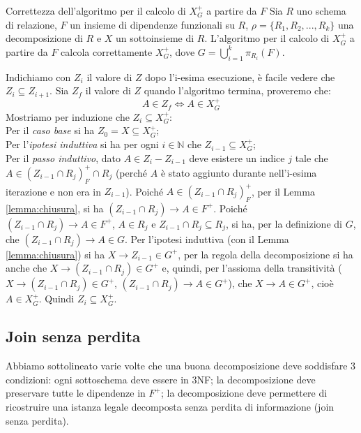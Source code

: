 \begin{enumerate}
    \begin{Thm}{Correttezza dell'algoritmo per il calcolo di $X^+_G$ a partire da $F$}{}
        Sia $R$ uno schema di relazione, $F$ un insieme di dipendenze funzionali su $R$, $\rho=\{R_1, R_2,..., R_k\}$ una decomposizione di $R$ e $X$ un sottoinsieme di $R$. L'algoritmo per il calcolo di $X^+_G$ a partire da $F$ calcola correttamente $X^+_G$, dove $G=\bigcup^k_{i=1}\pi_{R_i}(F)$.

        \begin{demonstration}
            Indichiamo con $Z_i$ il valore di $Z$ dopo l'i-esima esecuzione, è facile vedere che $Z_i\subseteq Z_{i+1}$. Sia $Z_f$ il valore di $Z$ quando l'algoritmo termina, proveremo che:
            \begin{equation*}
                A\in Z_f\iff A\in X^+_G
            \end{equation*}
            Mostriamo per induzione che $Z_i\subseteq X^+_G$:\\
            Per il \textit{caso base} si ha $Z_0=X\subseteq X^+_G$;\\
            Per l'\textit{ipotesi induttiva} si ha per ogni $i\in\mathbb{N}$ che $Z_{i-1}\subseteq X^+_G$;\\
            Per il \textit{passo induttivo}, dato $A\in Z_i-Z_{i-1}$ deve esistere un indice $j$ tale che $A\in(Z_{i-1}\cap R_j)^+_F\cap R_j$ (perché $A$ è stato aggiunto durante nell'i-esima iterazione e non era in $Z_{i-1}$). Poiché $A\in(Z_{i-1}\cap R_j)^+_F$, per il Lemma \ref{lemma:chiusura}, si ha $(Z_{i-1}\cap R_j)\to A\in F^+$. Poiché $(Z_{i-1}\cap R_j)\to A\in F^+$, $A\in R_j$ e $Z_{i-1}\cap R_j\subseteq R_j$, si ha, per la definizione di $G$, che $(Z_{i-1}\cap R_j)\to A\in G$. Per l'ipotesi induttiva (con il Lemma \ref{lemma:chiusura}) si ha $X\to Z_{i-1}\in G^+$, per la regola della decomposizione si ha anche che $X\to (Z_{i-1}\cap R_j)\in G^+$ e, quindi, per l'assioma della transitività ($X\to (Z_{i-1}\cap R_j)\in G^+$, $(Z_{i-1}\cap R_j)\to A\in G^+$), che $X\to A\in G^+$, cioè $A\in X^+_G$. Quindi $Z_i\subseteq X^+_G$.
        \end{demonstration}
    \end{Thm}
\end{enumerate}

\subsection{Join senza perdita}
Abbiamo sottolineato varie volte che una buona decomposizione deve soddisfare 3 condizioni: ogni sottoschema deve essere in 3NF; la decomposizione deve preservare tutte le dipendenze in $F^+$; la decomposizione deve permettere di ricostruire una istanza legale decomposta senza perdita di informazione (join senza perdita).


